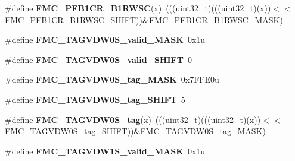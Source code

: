\begin{DoxyCompactItemize}
\item 
\#define {\bfseries F\+M\+C\+\_\+\+P\+F\+B1\+C\+R\+\_\+\+B1\+R\+W\+SC}(x)~(((uint32\+\_\+t)(((uint32\+\_\+t)(x))$<$$<$F\+M\+C\+\_\+\+P\+F\+B1\+C\+R\+\_\+\+B1\+R\+W\+S\+C\+\_\+\+S\+H\+I\+FT))\&F\+M\+C\+\_\+\+P\+F\+B1\+C\+R\+\_\+\+B1\+R\+W\+S\+C\+\_\+\+M\+A\+SK)\hypertarget{group__FMC__Register__Masks_ga6559adf24ec0a32fe28703fafd6a235e}{}\label{group__FMC__Register__Masks_ga6559adf24ec0a32fe28703fafd6a235e}

\item 
\#define {\bfseries F\+M\+C\+\_\+\+T\+A\+G\+V\+D\+W0\+S\+\_\+valid\+\_\+\+M\+A\+SK}~0x1u\hypertarget{group__FMC__Register__Masks_ga53cc204af469276cc9972aff2749de4c}{}\label{group__FMC__Register__Masks_ga53cc204af469276cc9972aff2749de4c}

\item 
\#define {\bfseries F\+M\+C\+\_\+\+T\+A\+G\+V\+D\+W0\+S\+\_\+valid\+\_\+\+S\+H\+I\+FT}~0\hypertarget{group__FMC__Register__Masks_ga4146a7816c19b4a472f7f0b4eca88677}{}\label{group__FMC__Register__Masks_ga4146a7816c19b4a472f7f0b4eca88677}

\item 
\#define {\bfseries F\+M\+C\+\_\+\+T\+A\+G\+V\+D\+W0\+S\+\_\+tag\+\_\+\+M\+A\+SK}~0x7\+F\+F\+E0u\hypertarget{group__FMC__Register__Masks_ga142a31eebf09fdb7f94e62f371e6a5f5}{}\label{group__FMC__Register__Masks_ga142a31eebf09fdb7f94e62f371e6a5f5}

\item 
\#define {\bfseries F\+M\+C\+\_\+\+T\+A\+G\+V\+D\+W0\+S\+\_\+tag\+\_\+\+S\+H\+I\+FT}~5\hypertarget{group__FMC__Register__Masks_ga98f1e6497478f043fb34fa0657777807}{}\label{group__FMC__Register__Masks_ga98f1e6497478f043fb34fa0657777807}

\item 
\#define {\bfseries F\+M\+C\+\_\+\+T\+A\+G\+V\+D\+W0\+S\+\_\+tag}(x)~(((uint32\+\_\+t)(((uint32\+\_\+t)(x))$<$$<$F\+M\+C\+\_\+\+T\+A\+G\+V\+D\+W0\+S\+\_\+tag\+\_\+\+S\+H\+I\+FT))\&F\+M\+C\+\_\+\+T\+A\+G\+V\+D\+W0\+S\+\_\+tag\+\_\+\+M\+A\+SK)\hypertarget{group__FMC__Register__Masks_gaf6713d1ea74fc0a7aac58b6cfb2f16a1}{}\label{group__FMC__Register__Masks_gaf6713d1ea74fc0a7aac58b6cfb2f16a1}

\item 
\#define {\bfseries F\+M\+C\+\_\+\+T\+A\+G\+V\+D\+W1\+S\+\_\+valid\+\_\+\+M\+A\+SK}~0x1u\hypertarget{group__FMC__Register__Masks_gaed37a62e513bc50a18cccf4cd8ee671e}{}\label{group__FMC__Register__Masks_gaed37a62e513bc50a18cccf4cd8ee671e}


\end{DoxyCompactItemize}
